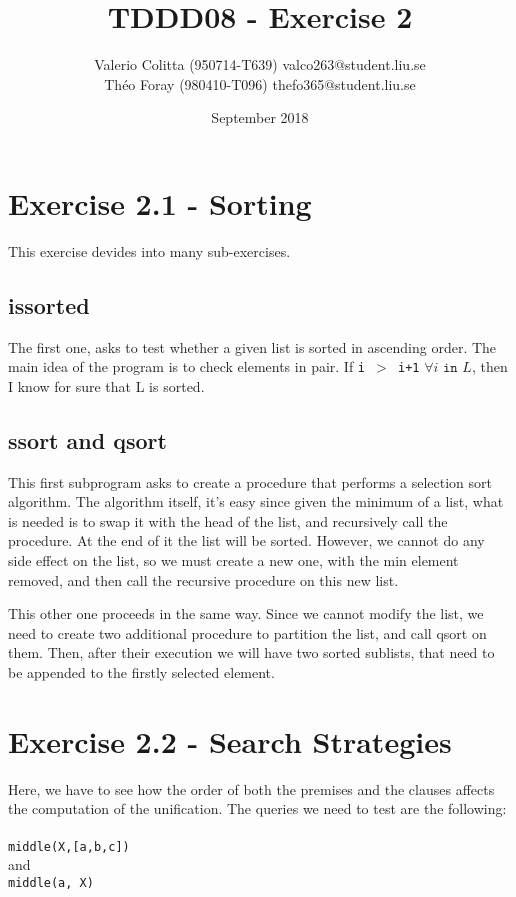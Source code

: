 \documentclass{article}
\title{TDDD08 - Exercise 2}
\author{Valerio Colitta (950714-T639) valco263@student.liu.se\\Théo Foray (980410-T096) thefo365@student.liu.se}
\date{September 2018}
\begin{document}
\maketitle

\section{Exercise 2.1 - Sorting}
This exercise devides into many sub-exercises.
\subsection{issorted}
The first one, asks to test whether a given list is sorted in ascending order. The main idea of the program is to check elements in pair. If \texttt{i $>$ i+1} $\forall i \texttt{ in } L$, then I know for sure that L is sorted.
\setcounter{lstlisting}{0}

\subsection{ssort and qsort}
This first subprogram asks to create a procedure that performs a selection sort algorithm. The algorithm itself, it's easy since given the minimum of a list, what is needed is to swap it with the head of the list, and recursively call the procedure. At the end of it the list will be sorted. However, we cannot do any side effect on the list, so we must create a new one, with the min element removed, and then call the recursive procedure on this new list.\clearpage
\setcounter{lstlisting}{1}

This other one proceeds in the same way. Since we cannot modify the list, we need to create two additional procedure to partition the list, and call qsort on them. Then, after their execution we will have two sorted sublists, that need to be appended to the firstly selected element.
\setcounter{lstlisting}{2}

\section{Exercise 2.2 - Search Strategies}
Here, we have to see how the order of both the premises and the clauses affects the computation of the unification. The queries we need to test are the following: \\ \\
\texttt{middle(X,[a,b,c])}\\ 
and\\
\texttt{middle(a, X)}\\
\end{document}
